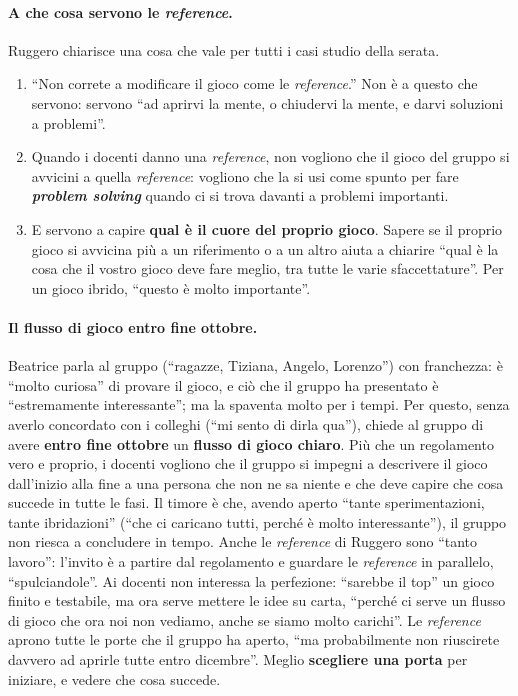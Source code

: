 \paragraph{A che cosa servono le \emph{reference}.} Ruggero chiarisce una cosa che vale
per tutti i casi studio della serata.
\begin{enumerate}
  \item ``Non correte a modificare il gioco come le \emph{reference}.'' Non è a questo
        che servono: servono ``ad aprirvi la mente, o chiudervi la mente, e darvi
        soluzioni a problemi''.
  \item Quando i docenti danno una \emph{reference}, non vogliono che il gioco del gruppo
        si avvicini a quella \emph{reference}: vogliono che la si usi come spunto per fare
        \textbf{\emph{problem solving}} quando ci si trova davanti a problemi importanti.
  \item E servono a capire \textbf{qual è il cuore del proprio gioco}. Sapere se il
        proprio gioco si avvicina più a un riferimento o a un altro aiuta a chiarire
        ``qual è la cosa che il vostro gioco deve fare meglio, tra tutte le varie
        sfaccettature''. Per un gioco ibrido, ``questo è molto importante''.
\end{enumerate}

\paragraph{Il flusso di gioco entro fine ottobre.} Beatrice parla al gruppo (``ragazze,
Tiziana, Angelo, Lorenzo'') con franchezza: è ``molto curiosa'' di provare il gioco, e ciò
che il gruppo ha presentato è ``estremamente interessante''; ma la spaventa molto per i
tempi. Per questo, senza averlo concordato con i colleghi (``mi sento di dirla qua''),
chiede al gruppo di avere \textbf{entro fine ottobre} un \textbf{flusso di gioco chiaro}.
Più che un regolamento vero e proprio, i docenti vogliono che il gruppo si impegni a
descrivere il gioco dall'inizio alla fine a una persona che non ne sa niente e che deve
capire che cosa succede in tutte le fasi. Il timore è che, avendo aperto ``tante
sperimentazioni, tante ibridazioni'' (``che ci caricano tutti, perché è molto
interessante''), il gruppo non riesca a concludere in tempo. Anche le \emph{reference}
di Ruggero sono ``tanto lavoro'': l'invito è a partire dal regolamento e guardare le
\emph{reference} in parallelo, ``spulciandole''. Ai docenti non interessa la perfezione:
``sarebbe il top'' un gioco finito e testabile, ma ora serve mettere le idee su carta,
``perché ci serve un flusso di gioco che ora noi non vediamo, anche se siamo molto
carichi''. Le \emph{reference} aprono tutte le porte che il gruppo ha aperto, ``ma
probabilmente non riuscirete davvero ad aprirle tutte entro dicembre''. Meglio
\textbf{scegliere una porta} per iniziare, e vedere che cosa succede.

